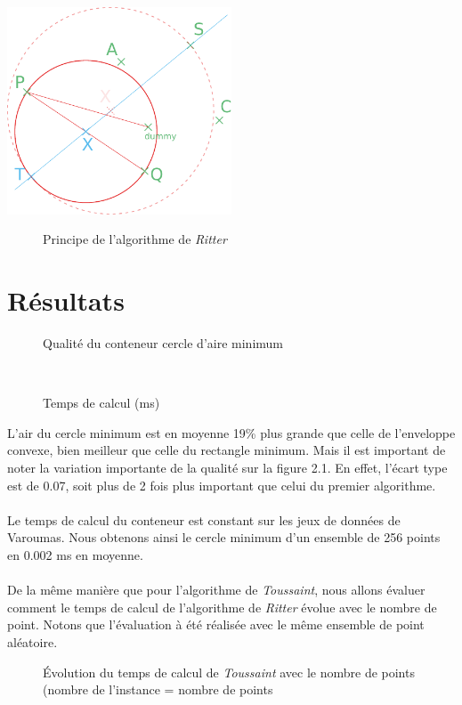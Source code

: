 \documentclass[a4paper, 12pt]{report}
\begin{document}
\begin{center}
\includegraphics[width=0.5\textwidth]{RitterSchema.pdf}
\begin{figure}[!h]
\caption{Principe de l'algorithme de \emph{Ritter}}
\end{figure}\end{center}
\section{Résultats}

\begin{figure}[htbp]
\centering
\begin{minipage}[t]{0.47\textwidth}
\def\svgscale{0.45}

\caption{Qualité du conteneur cercle d'aire minimum}
\end{minipage}
\hfill
\begin{minipage}[t]{0.47\textwidth}
   \
\def\svgscale{0.45}

\caption{Temps de calcul (ms)}
\end{minipage}
\end{figure}
L'air du cercle minimum est en moyenne 19\% plus grande que celle de l'enveloppe convexe, bien meilleur que celle du rectangle minimum. Mais il est important de noter la variation importante de la qualité sur la figure 2.1. En effet, l'écart type est de 0.07, soit plus de 2 fois plus important que celui du premier algorithme.

\paragraph{}
Le temps de calcul du conteneur est constant sur les jeux de données de Varoumas. Nous obtenons ainsi le cercle minimum d'un ensemble de 256 points en 0.002 ms en moyenne.
\paragraph{}
De la même manière que pour l'algorithme de \emph{Toussaint}, nous allons évaluer comment  le temps de calcul de l'algorithme de \emph{Ritter} évolue avec le nombre de point. Notons que l'évaluation à été réalisée avec le même ensemble de point aléatoire.
\begin{figure}[htbp]
\centering
\begin{minipage}[t]{0.47
\textwidth}
\def\svgscale{0.45}

\caption{Évolution du temps de calcul de \emph{Toussaint} avec le nombre de points (nombre de l'instance = nombre de points}
\end{minipage}
\end{figure}
\end{document}
